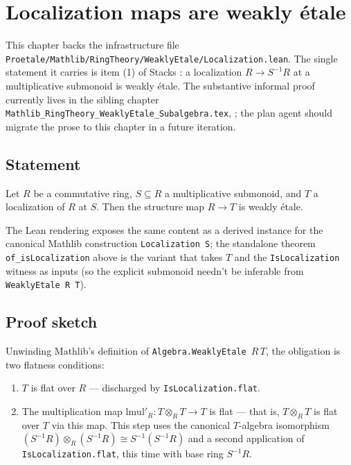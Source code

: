 \chapter{Localization maps are weakly étale}
\label{ch:mathlib-weakly-etale-localization}

This chapter backs the infrastructure file
\texttt{Proetale/Mathlib/RingTheory/WeaklyEtale/Localization.lean}. The
single statement it carries is item (1) of Stacks :
a localization $R \to S^{-1} R$ at a multiplicative submonoid is weakly
étale. The substantive informal proof currently lives in the sibling
chapter \texttt{Mathlib\_RingTheory\_WeaklyEtale\_Subalgebra.tex},
; the plan agent should migrate the
prose to this chapter in a future iteration.

\section{Statement}

\begin{lemma}
  \label{lem:mathlib-weaklyEtale-localization-mirror}
  Let $R$ be a commutative ring, $S \subseteq R$ a multiplicative
  submonoid, and $T$ a localization of $R$ at $S$. Then the structure
  map $R \to T$ is weakly étale.
\end{lemma}

The Lean rendering exposes the same content as a derived instance
 for the canonical Mathlib
construction \texttt{Localization S}; the standalone theorem
\texttt{of\_isLocalization} above is the variant that takes $T$ and the
\texttt{IsLocalization} witness as inputs (so the explicit submonoid
needn't be inferable from \texttt{WeaklyEtale R T}).

\section{Proof sketch}

Unwinding Mathlib's definition of \texttt{Algebra.WeaklyEtale}~$R\,T$,
the obligation is two flatness conditions:
\begin{enumerate}
  \item[(F1)] $T$ is flat over $R$ — discharged by
    \texttt{IsLocalization.flat}.
  \item[(F2)] The multiplication map
    $\mathrm{lmul}'_R : T \otimes_R T \to T$ is flat — that is,
    $T \otimes_R T$ is flat over $T$ via this map. This step uses the
    canonical $T$-algebra isomorphism
    $(S^{-1} R) \otimes_R (S^{-1} R) \cong S^{-1}(S^{-1} R)$ and a
    second application of \texttt{IsLocalization.flat}, this time with
    base ring $S^{-1} R$.
\end{enumerate}

